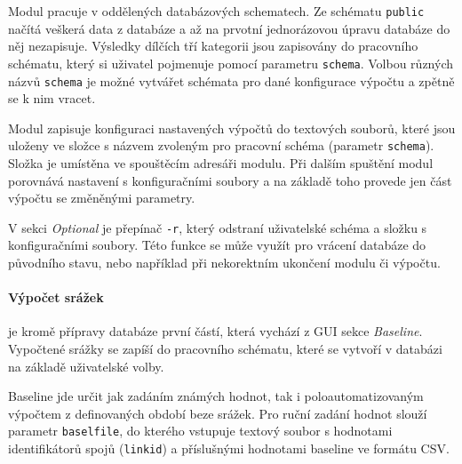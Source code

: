 \documentclass[a4paper,12pt,oneside]{report}
\begin{document}
Modul pracuje v oddělených databázových schematech. Ze schématu
\texttt{public} načítá veškerá data z databáze a až na prvotní
jednorázovou úpravu databáze do něj nezapisuje. Výsledky dílčích tří
kategorii jsou zapisovány do pracovního schématu, který si uživatel
pojmenuje pomocí parametru \texttt{schema}.  Volbou různých názvů
\texttt{schema} je možné vytvářet schémata pro dané konfigurace
výpočtu a zpětně se k nim vracet.

Modul zapisuje konfiguraci nastavených výpočtů do textových souborů,
které jsou uloženy ve složce s názvem zvoleným pro pracovní schéma
(parametr \texttt{schema}). Složka je umístěna ve spouštěcím adresáři
modulu. Při dalším spuštění modul porovnává nastavení s konfiguračními
soubory a na základě toho provede jen část výpočtu se změněnými
parametry.

V sekci \textit{Optional} je přepínač \texttt{-r}, který odstraní
uživatelské schéma a složku s konfiguračními soubory. Této funkce se
může využít pro vrácení databáze do původního stavu, nebo například
při nekorektním ukončení modulu či výpočtu.


\paragraph*{Výpočet srážek} je kromě přípravy databáze první částí,
která vychází z    \acs{GUI} sekce \textit{Baseline}. Vypočtené srážky se
zapíší do pracovního schématu, které se vytvoří v databázi na základě
uživatelské volby.

Baseline jde určit jak zadáním známých hodnot, tak i poloautomatizovaným
výpočtem z definovaných období beze srážek.  Pro ruční zadání hodnot
slouží parametr \texttt{baselfile}, do kterého vstupuje textový soubor
s hodnotami identifikátorů spojů (\texttt{linkid}) a příslušnými
hodnotami baseline ve formátu    \acs{CSV}.
\end{document}
